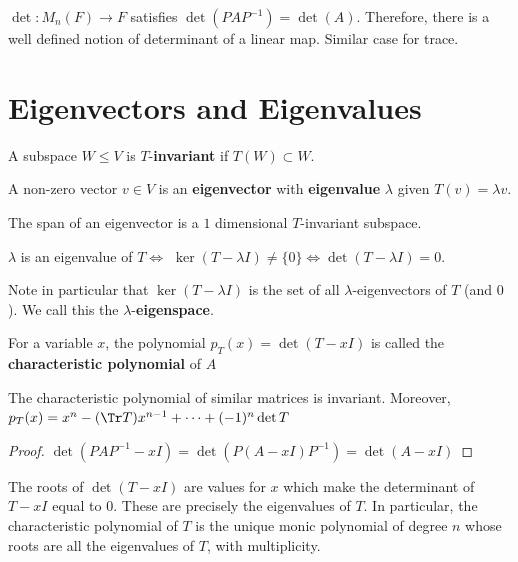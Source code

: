 \begin{ex}
    $\det:M_n(F) \to F$ satisfies $\det (PAP^{-1})=\det (A)$. Therefore, there is a well defined notion of determinant of a linear map. Similar case for trace.
\end{ex}

\section{Eigenvectors and Eigenvalues}

\begin{defn}
    A subspace $W \le V$ is $T$-\textbf{invariant} if $T(W) \subset W$.
\end{defn}

\begin{defn}
    A non-zero vector $v \in V$ is an \textbf{eigenvector} with \textbf{eigenvalue} $\lambda$ given $T(v)=\lambda v$.
\end{defn}

\begin{rmk}
    The span of an eigenvector is a $1$ dimensional $T$-invariant subspace.
\end{rmk}

\begin{prop}
    $\lambda$ is an eigenvalue of $T \iff$ $\ker (T-\lambda I) \neq \{0\} \iff \det (T-\lambda I)=0$.

    Note in particular that $\ker(T-\lambda I)$ is the set of all $\lambda$-eigenvectors of $T$ (and $0$). We call this the $\lambda$-\textbf{eigenspace}.
\end{prop}

\begin{defn}
    For a variable $x$, the polynomial $p_T(x) = \det (T-xI)$ is called the \textbf{characteristic polynomial} of $A$
\end{defn}

\begin{rmk}
    The characteristic polynomial of similar matrices is invariant. Moreover, $p_T(x) = x^n-(\Tr T)x^{n-1}+\cdots +(-1)^n\det T$
\end{rmk}

\begin{proof}
    $\det (PAP^{-1}-xI)=\det (P(A-xI)P^{-1})=\det(A-xI)$
\end{proof}

\begin{rmk}
    The roots of $\det (T-xI)$ are values for $x$ which make the determinant of $T-xI$ equal to $0$. These are precisely the eigenvalues of $T$. In particular, the characteristic polynomial of $T$ is the unique monic polynomial of degree $n$ whose roots are all the eigenvalues of $T$, with multiplicity.
\end{rmk}

